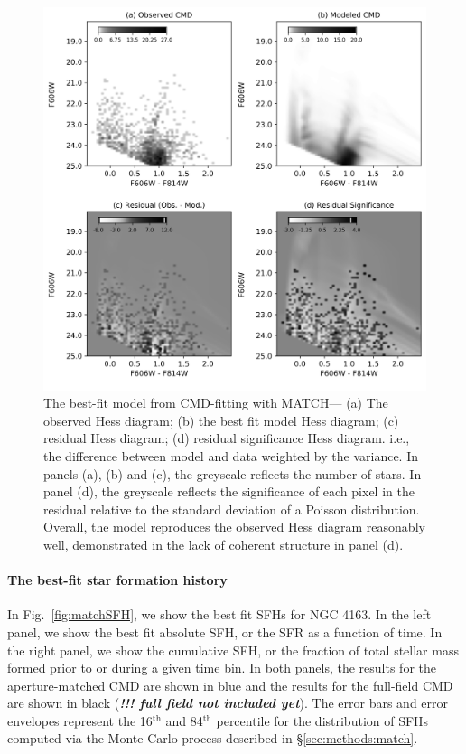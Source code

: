 \documentclass[preprint2]{aastex62}
\newcommand{\todo}[1]{\textbf{\textit{!!! #1}}}
\begin{document}
\begin{figure}
  \begin{center}
    \includegraphics[width=\linewidth]{figs/f4.png}
    \caption{{\sc The best-fit model from CMD-fitting with MATCH---} (a) The observed Hess diagram; (b) the best fit model Hess diagram; (c) residual Hess diagram; (d) residual significance Hess diagram. i.e., the difference between model and data weighted by the variance. In panels (a), (b) and (c), the greyscale reflects the number of stars. In panel (d), the greyscale reflects the significance of each pixel in the residual relative to the standard deviation of a Poisson distribution. Overall, the model reproduces the observed Hess diagram reasonably well, demonstrated in the lack of coherent structure in panel (d).}
    \label{fig:matchCMD}
  \end{center}
\end{figure}
\paragraph{The best-fit star formation history}

In Fig.~\ref{fig:matchSFH}, we show the best fit SFHs for NGC 4163. In the left panel, we show the best fit absolute SFH, or the SFR as a function of time. In the right panel, we show the cumulative SFH, or the fraction of total stellar mass formed prior to or during a given time bin. In both panels, the results for the aperture-matched CMD are shown in blue and the results for the full-field CMD are shown in black (\todo{full field not included yet}). The error bars and error envelopes represent the 16$^{\mathrm{th}}$ and 84$^{\mathrm{th}}$ percentile for the distribution of SFHs computed via the Monte Carlo process described in \S\ref{sec:methods:match}.
\end{document}

